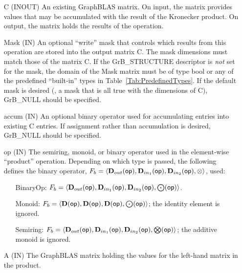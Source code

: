 \begin{itemize}[leftmargin=1.1in]
    \item[{\sf C}]    ({\sf INOUT}) An existing GraphBLAS matrix. On input,
    the matrix provides values that may be accumulated with the result of the
    Kronecker product.  On output, the matrix holds the results of the
    operation.

    \item[{\sf Mask}] ({\sf IN}) An optional ``write'' mask that controls which
    results from this operation are stored into the output matrix {\sf C}. The 
    mask dimensions must match those of the matrix {\sf C}. If the 
    {\sf GrB\_STRUCTURE} descriptor is {\em not} set for the mask, the domain of the 
    {\sf Mask} matrix must be of type {\sf bool} or any of the predefined 
    ``built-in'' types in Table~\ref{Tab:PredefinedTypes}.  If the default
    mask is desired (\ie, a mask that is all {\sf true} with the dimensions of {\sf C}), 
    {\sf GrB\_NULL} should be specified.

    \item[{\sf accum}] ({\sf IN}) An optional binary operator used for accumulating
    entries into existing {\sf C} entries.
    If assignment rather than accumulation is
    desired, {\sf GrB\_NULL} should be specified.

    \item[{\sf op}]   ({\sf IN}) The semiring, monoid, or binary operator 
    used in the element-wise ``product'' operation.  Depending on which type is
    passed, the following defines the binary operator, 
    $F_b=\langle \mbox{$\mathbf{D}_{out}$}({\sf op}),\mbox{$\mathbf{D}_{in_{1}}$}({\sf op}),\mbox{$\mathbf{D}_{in_{2}}$}({\sf op}),\otimes\rangle$, used:
    \begin{itemize}[leftmargin=1.1in]
    \item[BinaryOp:] $F_b = \langle \mbox{$\mathbf{D}_{out}$}({\sf op}), \mbox{$\mathbf{D}_{in_{1}}$}({\sf op}),
    \mbox{$\mathbf{D}_{in_{2}}$}({\sf op}),\bold{\bigodot}({\sf op})\rangle$.  
    \item[Monoid:] $F_b = \langle \bold{D}({\sf op}), \bold{D}({\sf op}),
    \bold{D}({\sf op}),\bold{\bigodot}({\sf op})\rangle$;
    the identity element is ignored. 
    \item[Semiring:] $F_b = \langle \mbox{$\mathbf{D}_{out}$}({\sf op}), \mbox{$\mathbf{D}_{in_{1}}$}({\sf op}),
    \mbox{$\mathbf{D}_{in_{2}}$}({\sf op}),\bold{\bigotimes}({\sf op})\rangle$; the
    additive monoid is ignored.
    \end{itemize}

    \item[{\sf A}]    ({\sf IN}) The GraphBLAS matrix holding the values
    for the left-hand matrix in the product.


\end{itemize}
